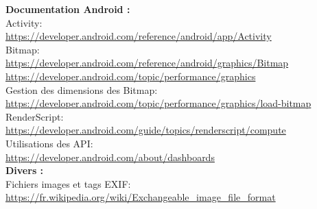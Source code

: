 \documentclass[12pt, a4paper]{article}
\begin{document}
\textbf{Documentation Android :}
\\
Activity:
\\
\url{https://developer.android.com/reference/android/app/Activity}
\\
Bitmap:
\\
\url{https://developer.android.com/reference/android/graphics/Bitmap}
\url{https://developer.android.com/topic/performance/graphics}
\\
Gestion des dimensions des Bitmap:
\\
\url{https://developer.android.com/topic/performance/graphics/load-bitmap}
\\
RenderScript:
\\
\url{https://developer.android.com/guide/topics/renderscript/compute}
\\
Utilisations des API:
\\
\url{https://developer.android.com/about/dashboards}
\\


\textbf{Divers :}
\\
Fichiers images et tags EXIF:
\\
\url{https://fr.wikipedia.org/wiki/Exchangeable_image_file_format}
\\
\end{document}
